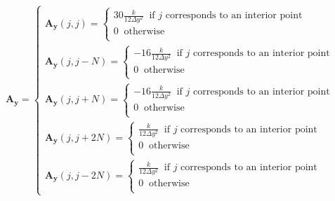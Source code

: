 \documentclass[12 pt, final]{article}
\begin{document}
\begin{itemize}
\begin{itemize}
\begin{enumerate}
        \begin{align*}
                    \mathbf{A_y} = \begin{cases}
                    \mathbf{A_y}(j,j) =
                    \begin{cases}
                    30\frac{k}{12\Delta y^2} \: \text{ if $j$ corresponds to an interior point}\:\\
                    0 \: \text{ otherwise}\:\\
                    \end{cases}\\
                    \mathbf{A_y}(j,j-N) =
                    \begin{cases}
                    -16\frac{k}{12\Delta y^2} \: \text{ if $j$ corresponds to an interior point}\:\\
                    0 \: \text{ otherwise}\:\\
                    \end{cases}\\
                    \mathbf{A_y}(j,j+N) =
                    \begin{cases}
                    -16\frac{k}{12\Delta y^2} \: \text{ if $j$ corresponds to an interior point}\:\\
                    0 \: \text{ otherwise}\:\\
                    \end{cases}\\
                    \mathbf{A_y}(j,j+2N) =
                    \begin{cases}
                    \frac{k}{12\Delta y^2} \: \text{ if $j$ corresponds to an interior point}\:\\
                    0 \: \text{ otherwise}\:\\
                    \end{cases}\\
                    \mathbf{A_y}(j,j-2N) =
                    \begin{cases}
                    \frac{k}{12\Delta y^2} \: \text{ if $j$ corresponds to an interior point}\:\\
                    0 \: \text{ otherwise}\:\\
                    \end{cases}                    
                    \end{cases}
            \end{align*}
        \begin{align*}

\end{align*}
\end{enumerate}
\end{itemize}
\end{itemize}
\end{document}
